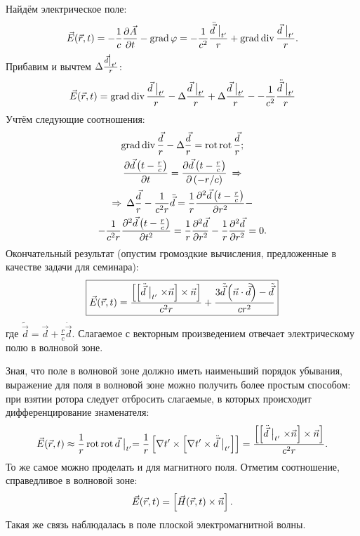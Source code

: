     Найдём электрическое поле:
    \begin{gather*}
        \vec{E}(\vec{r}, t) = -\frac 1c \frac{\partial\vec{A}}{\partial t} - \operatorname{grad}\varphi = 
        -\frac{1}{c^2}\frac{\ddot{\vec{d}}\bigm|_{t'}}{r} + \operatorname{grad}\operatorname{div}\frac{\vec{d}\bigm|_{t'}}{r}.
    \end{gather*}
    Прибавим и вычтем $\Delta\frac{\vec{d}\bigm|_{t'}}{r}$:
    \begin{gather}
        \vec{E}(\vec{r}, t) = \operatorname{grad}\operatorname{div}\frac{\vec{d}\bigm|_{t'}}{r} - \Delta\frac{\vec{d}\bigm|_{t'}}{r} + \Delta\frac{\vec{d}\bigm|_{t'}}{r}
        - -\frac{1}{c^2}\frac{\ddot{\vec{d}}\bigm|_{t'}}{r}
    \end{gather}
    Учтём следующие соотношения:
    \begin{gather*}
        \operatorname{grad}\operatorname{div}\frac{\vec{d}}{r} - \Delta\frac{\vec{d}}{r} = \operatorname{rot}\operatorname{rot}\frac{\vec{d}}{r};\\
        \frac{\partial\vec{d}\left({t - \frac{r}{c}}\right)}{\partial t} = \frac{\partial\vec{d}\left({t - \frac{r}{c}}\right)}{\partial\left({-r / c}\right)} \: \Rightarrow \\
        \Rightarrow \: \Delta\frac{\vec{d}}{r} - \frac{1}{c^2r}\ddot{\vec{d}} =
        \frac 1r \frac{\partial^2\vec{d}\left({t - \frac{r}{c}}\right)}{\partial{r}^2} - \\ - \frac{1}{c^2r}\frac{\partial^2\vec{d}\left({t - \frac{r}{c}}\right)}{\partial{t}^2}=
        \frac 1r \frac{\partial^2\vec{d}}{\partial{r}^2} - \frac 1r \frac{\partial^2\vec{d}}{\partial{r}^2} = 0.
    \end{gather*}
    Окончательный результат (опустим громоздкие вычисления, предложенные в качестве задачи для семинара):
    \[
        \boxed{\vec{E}(\vec{r}, t) = \frac{\left[{\left[{\ddot{\vec{d}}\bigm|_{t'} \times \vec{n}}\right] \times \vec{n}}\right]}{c^2 r} +
        \frac{3\tilde{\vec{d}}\left({\vec{n} \cdot \tilde{\vec{d}}}\right) - \tilde{\vec{d}}}{cr^2}}
    \]
    где $\displaystyle \tilde{\vec{d}} = \vec{d} + \frac{r}{c}\dot{\vec{d}}$. Слагаемое с векторным произведением отвечает
    электрическому полю в волновой зоне.

    Зная, что поле в волновой зоне должно иметь наименьший порядок убывания, выражение для поля в волновой зоне можно получить более простым
    способом: при взятии ротора следует отбросить слагаемые, в которых происходит дифференцирование знаменателя:
    \[
        \vec{E}(\vec{r}, t) \approx \frac 1r \operatorname{rot}\operatorname{rot} \vec{d}\bigm|_{t'} = \frac 1r \left[{\nabla t' \times \left[{\nabla t' \times \ddot{\vec{d}}\bigm|_{t'}}\right]}\right] = 
        \frac{\left[{\left[{\ddot{\vec{d}}\bigm|_{t'} \times \vec{n}}\right] \times \vec{n}}\right]}{c^2r}.
    \]
    То же самое можно проделать и для магнитного поля. Отметим соотношение, справедливое в волновой зоне:
    \[
        \vec{E}(\vec{r}, t) = \left[{\vec{H}(\vec{r}, t) \times \vec{n}}\right].
    \]
    Такая же связь наблюдалась в поле плоской электромагнитной волны.

